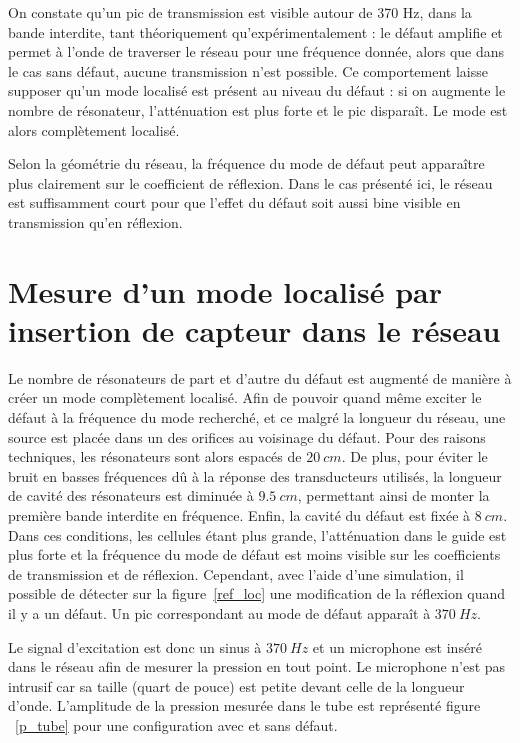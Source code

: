 On constate qu'un pic de transmission est visible autour de 370 Hz, dans la bande interdite, tant théoriquement qu'expérimentalement : le défaut amplifie et permet à l'onde de traverser le réseau pour une fréquence donnée, alors que dans le cas sans défaut, aucune transmission n'est possible. Ce comportement laisse supposer qu'un mode localisé est présent au niveau du défaut : si on augmente le nombre de résonateur, l'atténuation est plus forte et le pic disparaît. Le mode est alors complètement localisé. 

Selon la géométrie du réseau, la fréquence du mode de défaut peut apparaître plus clairement sur le coefficient de réflexion. Dans le cas présenté ici, le réseau est suffisamment court pour que l'effet du défaut soit aussi bine visible en transmission qu'en réflexion.



\section{Mesure d'un mode localisé par insertion de capteur dans le réseau}



Le nombre de résonateurs de part et d'autre du défaut est augmenté de manière à créer un mode complètement localisé. Afin de pouvoir quand même exciter le défaut à la fréquence du mode recherché, et ce malgré la longueur du réseau, une source est placée dans un des orifices au voisinage du défaut. Pour des raisons techniques, les résonateurs sont alors espacés de $20~cm$. De plus, pour éviter le bruit en basses fréquences dû à la réponse des transducteurs utilisés, la longueur de cavité des résonateurs est diminuée à $9.5~cm$, permettant ainsi de monter la première bande interdite en fréquence. Enfin, la cavité du défaut est fixée à $8~cm$. Dans ces conditions, les cellules étant plus grande, l'atténuation dans le guide est plus forte et la fréquence du mode de défaut est moins visible sur les coefficients de transmission et de réflexion. Cependant, avec l'aide d'une simulation, il possible de détecter sur la figure~\ref{ref_loc} une modification de la réflexion quand il y a un défaut. Un pic correspondant au mode de défaut apparaît à $370~Hz$.



 Le signal d'excitation est donc un sinus à $370~Hz$ et un microphone est inséré dans le réseau afin de mesurer la pression en tout point. Le microphone n'est pas intrusif car sa taille (quart de pouce) est petite devant celle de la longueur d'onde. L'amplitude de la pression mesurée dans le tube est représenté figure ~\ref{p_tube} pour une configuration avec et sans défaut. 


